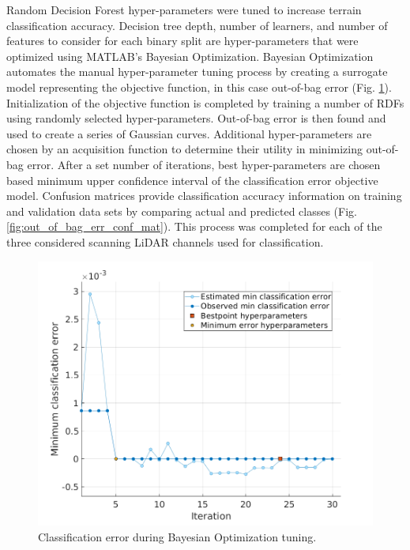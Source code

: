 \documentclass[numbered,pdftex]{ohio-etd}
\begin{document}
{{{{				{Random Decision Forest hyper-parameters were tuned to increase terrain classification accuracy. Decision tree depth, number of learners, and number of features to consider for each binary split are hyper-parameters that were optimized using MATLAB's Bayesian Optimization. Bayesian Optimization automates the manual hyper-parameter tuning process by creating a surrogate model representing the objective function, in this case out-of-bag error (Fig. \ref{fig:c2_min_class_error}). Initialization of the objective function is completed by training a number of RDFs using randomly selected hyper-parameters. Out-of-bag error is then found and used to create a series of Gaussian curves. Additional hyper-parameters are chosen by an acquisition function to determine their utility in minimizing out-of-bag error. After a set number of iterations, best hyper-parameters are chosen based minimum upper confidence interval of the classification error objective model. Confusion matrices provide classification accuracy information on training and validation data sets by comparing actual and predicted classes (Fig. \ref{fig:out_of_bag_err_conf_mat}). This process was completed for each of the three considered scanning LiDAR channels used for classification.}
					
				\begin{figure}[H]
					\centering
					\includegraphics[width=0.75\linewidth]{Defense_Images/c2_min_class_error}
					\caption[RDF Training Classification Error]{Classification error during Bayesian Optimization tuning.}
					\label{fig:c2_min_class_error}
				\end{figure}				
				
}}}}
\end{document}
